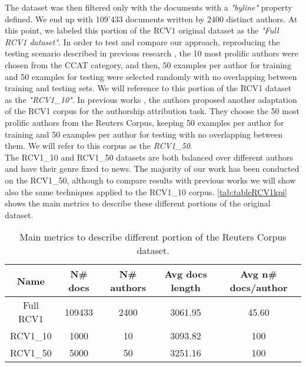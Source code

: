 The dataset was then filtered only with the documents with a \textit{"byline"} property defined. We end up with 109'433 documents written by 2400 distinct authors. At this point, we labeled this portion of the RCV1 original dataset as the \textit{"Full RCV1 dataset"}.
In order to test and compare our approach, reproducing the testing scenario
described in previous research \cite{stamatatos2009survey}, the 10 most prolific authors were chosen from the CCAT category, and then, 50 examples per author for training and 50 examples for testing were selected randomly with no overlapping between training and testing sets. We will reference to this portion of the RCV1 dataset as the \textit{"RCV1\_10"}.
In previous works \cite{houvardas2006n}, the authors proposed another adaptation of the RCV1 corpus for the authorship attribution task. They choose the 50 most prolific authors from the Reuters Corpus, keeping 50 examples per author for training and 50 examples per author for testing with no
overlapping between them. We will refer to this corpus as the \textit{RCV1\_50}.\\
The RCV1\_10 and RCV1\_50 datasets are both balanced over different authors and have their genre fixed to news.
The majority of our work has been conducted on the RCV1\_50, although to compare results with previous works we will show also the same techniques applied to the RCV1\_10 corpus.
\autoref{tab:tableRCV1kpi} shows the main metrics to describe these different portions of the original dataset.

\begin{table}[h!]
	\begin{center}  
		\caption[Reuters Corpus metrics]{Main metrics to describe different portion of the Reuters Corpus dataset.} 
		\label{tab:tableRCV1kpi}
		\begin{tabular}{|c | c | c | c | c |}
			\hline 
			Name & N\# docs & N\# authors & Avg docs length & Avg n\# docs/author \\
			\hline
			Full RCV1 & 109433 & 2400 & 3061.95 & 45.60 \\ \hline
			RCV1\_10 & 1000 & 10 & 3093.82 & 100  \\ \hline
			RCV1\_50 & 5000 & 50 & 3251.16 & 100  \\ \hline
		\end{tabular} 
	\end{center}
\end{table}

